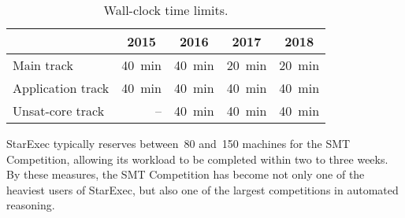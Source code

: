 \documentclass[twoside,11pt]{article}
\begin{document}
\begin{table}
  \caption{Wall-clock time limits.}
  \label{table:time-limits}
  \centering
  \begin{tabular}{|l|r|r|r|r|}
    \hline
    & \multicolumn{1}{c|}{2015} & \multicolumn{1}{c|}{2016} & \multicolumn{1}{c|}{2017} & \multicolumn{1}{c|}{2018} \\
    \hline
    Main track        & 40~min & 40~min & 20~min\protect\footnotemark & 20~min \\
    Application track & 40~min & 40~min & 40~min\phantom{$^{1.}$} & 40~min \\
    Unsat-core track  &     -- & 40~min & 40~min\phantom{$^{1.}$} & 40~min \\
    \hline
  \end{tabular}
\end{table}

StarExec typically reserves between~80 and~150 machines for the SMT
Competition, allowing its workload to be completed within two to three
weeks.  By these measures, the SMT Competition has become not only one
of the heaviest users of StarExec, but also one of the largest
competitions in automated reasoning.
\end{document}
